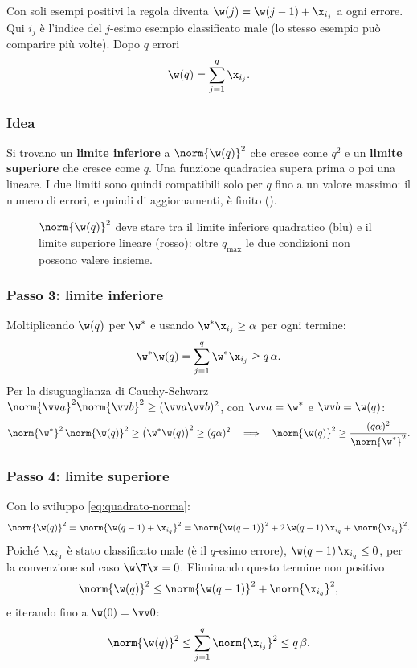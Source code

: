 Con soli esempi positivi la regola diventa $\w(j) = \w(j-1)+\x_{i_j}$ a ogni errore. Qui $i_j$ è l'indice del
$j$-esimo esempio classificato male (lo stesso esempio può comparire più volte). Dopo $q$ errori
\[
\w(q) = \sum_{j=1}^{q}\x_{i_j}.
\]

\subsubsection{Idea}
Si trovano un \textbf{limite inferiore} a $\norm{\w(q)}^2$ che cresce come $q^2$ e un \textbf{limite superiore}
che cresce come $q$. Una funzione quadratica supera prima o poi una lineare. I due limiti sono quindi compatibili
solo per $q$ fino a un valore massimo: il numero di errori, e quindi di aggiornamenti, è finito
().

\begin{figure}[ht]
\centering
{}
\caption{$\norm{\w(q)}^2$ deve stare tra il limite inferiore quadratico (blu) e il limite superiore lineare
(rosso): oltre $q_{\max}$ le due condizioni non possono valere insieme.}
\label{fig:convergenza}
\end{figure}

\subsubsection{Passo 3: limite inferiore}
Moltiplicando $\w(q)$ per $\w^*$ e usando $\w^*\x_{i_j}\ge\alpha$ per ogni termine:
\[
\w^*\w(q) = \sum_{j=1}^{q}\w^*\x_{i_j} \ge q\,\alpha .
\]
Per la disuguaglianza di Cauchy-Schwarz $\norm{\vv a}^2\norm{\vv b}^2\ge(\vv a\vv b)^2$, con $\vv a = \w^*$ e
$\vv b=\w(q)$:
\[
\norm{\w^*}^2\,\norm{\w(q)}^2 \ge \big(\w^*\w(q)\big)^2 \ge (q\alpha)^2
\quad\Longrightarrow\quad
\norm{\w(q)}^2 \ge \frac{(q\alpha)^2}{\norm{\w^*}^2}.
\]

\subsubsection{Passo 4: limite superiore}
Con lo sviluppo \eqref{eq:quadrato-norma}:
\[
\norm{\w(q)}^2 = \norm{\w(q-1)+\x_{i_q}}^2 = \norm{\w(q-1)}^2 + 2\,\w(q-1)\,\x_{i_q} + \norm{\x_{i_q}}^2 .
\]
Poiché $\x_{i_q}$ è stato classificato male (è il $q$-esimo errore), $\w(q-1)\,\x_{i_q}\le0$, per la convenzione
sul caso $\w\T\x=0$. Eliminando questo termine non positivo
\[
\norm{\w(q)}^2 \le \norm{\w(q-1)}^2 + \norm{\x_{i_q}}^2 ,
\]
e iterando fino a $\w(0)=\vv0$:
\[
\norm{\w(q)}^2 \le \sum_{j=1}^{q}\norm{\x_{i_j}}^2 \le q\,\beta .
\]

